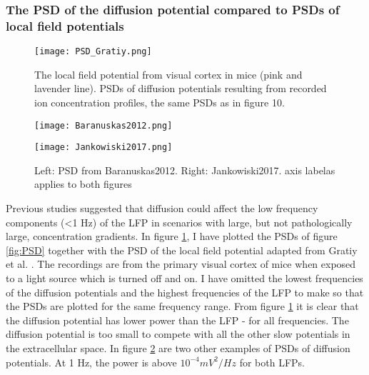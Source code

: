 \documentclass{article}
\begin{document}
\subsubsection{The PSD of the diffusion potential compared to PSDs of local field potentials}

\begin{figure}
  \texttt{[image: PSD\_Gratiy.png]}
  \caption{The local field potential from visual cortex in mice (pink and lavender line). PSDs of diffusion potentials resulting from recorded ion concentration profiles, the same PSDs as in figure 10.}
  \label{fig:PSD_Gratiy}
\end{figure}


\begin{figure}
 
   \begin{minipage}[b]{0.45\textwidth}
    \texttt{[image: Baranuskas2012.png]}
  \end{minipage}
     \begin{minipage}[b]{0.45\textwidth}
    \texttt{[image: Jankowiski2017.png]}
  \end{minipage}
  \caption{Left: PSD from Baranuskas2012. Right: Jankowiski2017. axis labelas applies to both figures}
  \label{fig:PSD_of_LFP}
\end{figure}

Previous studies suggested that diffusion could affect the low frequency components (<1 Hz) of the LFP in scenarios with large, but not pathologically large, concentration gradients. In figure \ref{fig:PSD_Gratiy}, I have plotted the PSDs of figure \ref{fig:PSD} together with the PSD of the local field potential adapted from Gratiy et al. \cite{Gratiy2017}. The recordings are from the primary visual cortex of mice when exposed to a light source which is turned off and on. I have omitted the lowest frequencies of the diffusion potentials and the highest frequencies of the LFP to make so that the PSDs are plotted for the same frequency range. From figure \ref{fig:PSD_Gratiy} it is clear that the diffusion potential has lower power than the LFP  - for all frequencies. The diffusion potential is too small to compete with all the other slow potentials in the extracellular space. In figure \ref{fig:PSD_of_LFP} are two other examples of PSDs of diffusion potentials. At 1 Hz, the power is above $10^{-4} mV^2/Hz$ for both LFPs.
\end{document}
